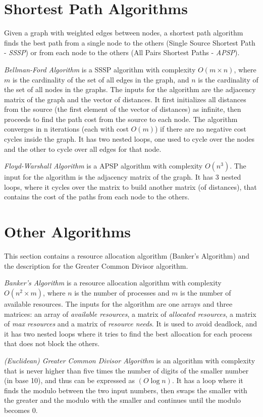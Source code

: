 \section{Shortest Path Algorithms}

Given a graph with weighted edges between nodes, a shortest path algorithm finds the best path from 
a single node to the others (Single Source Shortest Path - \emph{SSSP}) or from each node to the others 
(All Pairs Shortest Paths - \emph{APSP}).

\bigskip \noindent
\emph{Bellman-Ford Algorithm} is a SSSP algorithm with complexity $O(m\times n)$,
where $m$ is the cardinality of the set of all edges in the graph, and $n$ is the cardinality of the set
of all nodes in the graphs. The inputs for the algorithm are the adjacency matrix of the graph 
and the vector of distances. It first initializes all distances from the source (the first element of the
vector of distances) as infinite, then proceeds to find the path cost from the source to each node. 
The algorithm converges in n iterations (each with cost $O(m)$) if there are no negative cost cycles
inside the graph. It has two nested loops, one used to cycle over the nodes and the other to cycle over
all edges for that node. 

\bigskip \noindent
\emph{Floyd-Warshall Algorithm} is a APSP algorithm with complexity $O(n^3)$. The input for the algorithm
is the adjacency matrix of the graph. It has 3 nested loops, where it cycles over the matrix to build
another matrix (of distances), that contains the cost of the paths from each node to the others.

\section{Other Algorithms}

This section contains a resource allocation algorithm (Banker's Algorithm) and the description for
the Greater Common Divisor algorithm.

\bigskip \noindent
\emph{Banker's Algorithm} is a resource allocation algorithm with complexity $O(n^2 \times m)$, where $n$
is the number of processes and $m$ is the number of available resources. The inputs for the algorithm
are one arrays and three matrices: an array of \emph{available resources}, a matrix of \emph{allocated
resources}, a matrix of \emph{max resources} and a matrix of \emph{resource needs}. It is used to avoid
deadlock, and it has two nested loops where it tries to find the best allocation for each process
that does not block the others.

\bigskip \noindent
\emph{(Euclidean) Greater Common Divisor Algorithm} is an algorithm with complexity that is never
higher than five times the number of digits of the smaller number (in base 10), and thus can be expressed
as $(O\log n)$. It has a loop where it finds the modulo between the two input numbers, 
then swaps the smaller with the greater and the modulo with the smaller and continues until the
modulo becomes 0.













